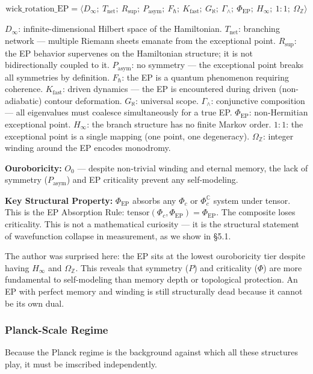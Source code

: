 \documentclass[12pt,a4paper]{article}
\newcommand{\pilcrow}{\S}
\begin{document}
\[\text{wick\_rotation\_EP} = \langle D_{\infty};\ T_{\text{net}};\ R_{\text{sup}};\ P_{\text{asym}};\ F_{\hbar};\ K_{\text{fast}};\ G_{\aleph};\ \Gamma_{\wedge};\ \Phi_{\text{EP}};\ H_{\infty};\ 1{:}1;\ \Omega_\mathbb{Z} \rangle\]

$D_{\infty}$: infinite-dimensional Hilbert space of the Hamiltonian. $T_{\text{net}}$: branching network --- multiple Riemann sheets emanate from the exceptional point. $R_{\text{sup}}$: the EP behavior supervenes on the Hamiltonian structure; it is not bidirectionally coupled to it. $P_{\text{asym}}$: no symmetry --- the exceptional point breaks all symmetries by definition. $F_{\hbar}$: the EP is a quantum phenomenon requiring coherence. $K_{\text{fast}}$: driven dynamics --- the EP is encountered during driven (non-adiabatic) contour deformation. $G_{\aleph}$: universal scope. $\Gamma_{\wedge}$: conjunctive composition --- all eigenvalues must coalesce simultaneously for a true EP. $\Phi_{\text{EP}}$: non-Hermitian exceptional point. $H_{\infty}$: the branch structure has no finite Markov order. $1{:}1$: the exceptional point is a single mapping (one point, one degeneracy). $\Omega_\mathbb{Z}$: integer winding around the EP encodes monodromy.

\textbf{Ouroboricity:} $O_0$ --- despite non-trivial winding and eternal memory, the lack of symmetry ($P_{\text{asym}}$) and EP criticality prevent any self-modeling.

\textbf{Key Structural Property:} $\Phi_{\text{EP}}$ absorbs any $\Phi_c$ or $\Phi_c^\mathbb{C}$ system under tensor. This is the EP Absorption Rule: $\text{tensor}(\Phi_c, \Phi_{\text{EP}}) = \Phi_{\text{EP}}$. The composite loses criticality. This is not a mathematical curiosity --- it is the structural statement of wavefunction collapse in measurement, as we show in \pilcrow{}5.1.

The author was surprised here: the EP sits at the lowest ouroboricity tier despite having $H_{\infty}$ and $\Omega_\mathbb{Z}$. This reveals that symmetry ($P$) and criticality ($\Phi$) are more fundamental to self-modeling than memory depth or topological protection. An EP with perfect memory and winding is still structurally dead because it cannot be its own dual.

\subsubsection{Planck-Scale Regime}

Because the Planck regime is the background against which all these structures play, it must be imscribed independently.
\end{document}
